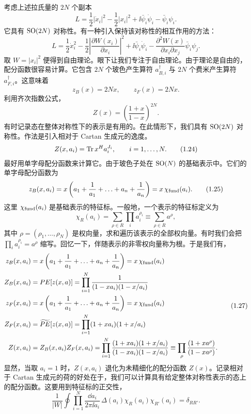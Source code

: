 考虑上述拉氏量的 $2N$ 个副本
\[
L = \frac{1}{2}|\dot x_i|^2 - \frac{1}{2}|x_i|^2 + \ii\bar\psi_i\dot\psi_i - \bar\psi_i\psi_i .
\tag{1.20}
\]
它具有 $\operatorname{SO}(2N)$ 对称性。有一种引入保持该对称性的相互作用的方法：
\[
L = \frac{1}{2}\dot x_i^2 - \frac{1}{2}\left|\frac{\partial W(x_i)}{\partial x_i}\right|^2 + \ii\bar\psi_i\dot\psi_i - \frac{\partial^2 W(x)}{\partial x_i\partial x_j}\bar\psi_i\psi_j .
\tag{1.21}
\]
取 $W = |x_i|^2$ 便得到自由理论。眼下让我们专注于自由理论。由于理论是自由的，配分函数很容易计算。它包含 $2N$ 个玻色产生算符 $a_{B,i}^\dagger$ 与 $2N$ 个费米产生算符 $a_{F,i}^\dagger$。这意味着
\[
z_B(x) = 2N x ,\qquad z_F(x) = 2N x .
\tag{1.22}
\]
利用齐次指数公式，
\[
Z(x) = \left(\frac{1+x}{1-x}\right)^{2N} .
\tag{1.23}
\]
有时记录态在整体对称性下的表示是有用的。在此情形下，我们具有 $\operatorname{SO}(2N)$ 对称性。作法是引入相对于 Cartan 生成元的逸度。
\[
Z(x,a_i) = \operatorname{Tr} x^H a_i^{J_i} ,\qquad i = 1,\ldots,N .
\tag{1.24}
\]
最好用单字母配分函数来计算它。由于玻色子处在 $\operatorname{SO}(N)$ 的基础表示中。它们的单字母配分函数为
\[
z_B(x,a_i) = x\left(a_1 + \frac{1}{a_1} + \ldots + a_n + \frac{1}{a_n}\right) = x\,\chi_{\operatorname{fund}}(a_i) .
\tag{1.25}
\]
这里 $\chi_{\operatorname{fund}}(a_i)$ 是基础表示的特征标。一般地，一个表示的特征标定义为
\[
\chi_R(a_i) = \sum_{\rho\in R}\prod_i a_i^{\rho_i} \equiv \sum_{\rho\in R} a^\rho ,
\tag{1.26}
\]
其中 $\rho = (\rho_1,\ldots,\rho_N)$ 是权向量，求和遍历该表示的全部权向量。有时我们会把 $\prod_i a_i^{\rho_i} = a^\rho$ 缩写。回忆一下，伴随表示的非零权向量称为根。于是我们有，
\[
\begin{aligned}
z_B(x,a_i) &= x\left(a_1 + \frac{1}{a_1} + \ldots + a_n + \frac{1}{a_n}\right) = x\,\chi_{\operatorname{fund}}(a_i)\\
Z_B(x,a_i) &= PE[z(x,a)] = \prod_{i=1}^{N}\frac{1}{(1-x a_i)(1-x/a_i)}\\
z_F(x,a_i) &= x\left(a_1 + \frac{1}{a_1} + \ldots + a_n + \frac{1}{a_n}\right) = x\,\chi_{\operatorname{fund}}(a_i)\\
Z_F(x,a_i) &= \widetilde{PE}[z(x,a)] = \prod_{i=1}^{N}(1+x a_i)(1+x/a_i)\\
Z(x,a_i) &= Z_B(x,a_i)Z_F(x,a_i) = \prod_{i=1}^{N}\frac{(1+x a_i)(1+x/a_i)}{(1-x a_i)(1-x/a_i)} \equiv \prod_{\rho}\frac{(1+x a^\rho)}{(1-x a^\rho)} .
\end{aligned}
\tag{1.27}
\]
显然，当取 $a_i = 1$ 时，$Z(x,a_i)$ 退化为未精细化的配分函数 $Z(x)$。记录相对于 Cartan 生成元的荷的好处在于，我们可以计算具有给定整体对称性表示的态上的配分函数。这要用到特征标的正交性，
\[
\frac{1}{|W|}\oint\prod_{i=1}^{N}\frac{\dd a_i}{2\pi\ii a_i}\,\Delta(a_i)\chi_R(a_i)\chi_{R'}(a_i) = \delta_{RR'} .
\tag{1.28}
\]
